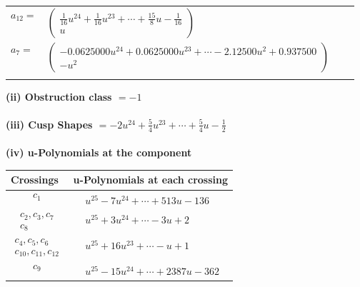 \documentclass[1p]{elsarticle_modified}
\theoremstyle{definition}
\begin{document}
\begin{tabular}{m{7pt} m{180pt} m{7pt} m{180pt} }
\flushright $a_{12}=$&$\begin{pmatrix}\frac{1}{16} u^{24}+\frac{1}{16} u^{23}+\cdots+\frac{15}{8} u-\frac{1}{16}\\u\end{pmatrix}$ \\
\flushright $a_{7}=$&$\begin{pmatrix}-0.0625000 u^{24}+0.0625000 u^{23}+\cdots-2.12500 u^{2}+0.937500\\- u^2\end{pmatrix}$\\&\end{tabular}
\flushleft \textbf{(ii) Obstruction class $= -1$}\\~\\
\flushleft \textbf{(iii) Cusp Shapes $= -2 u^{24}+\frac{5}{4} u^{23}+\cdots+\frac{5}{4} u-\frac{1}{2}$}\\~\\
\newpage\renewcommand{\arraystretch}{1}
\flushleft \textbf{(iv) u-Polynomials at the component}\newline \\
\begin{tabular}{m{50pt}|m{274pt}}
Crossings & \hspace{64pt}u-Polynomials at each crossing \\
\hline $$\begin{aligned}c_{1}\end{aligned}$$&$\begin{aligned}
&u^{25}-7 u^{24}+\cdots+513 u-136
\end{aligned}$\\
\hline $$\begin{aligned}c_{2},c_{3},c_{7}\\c_{8}\end{aligned}$$&$\begin{aligned}
&u^{25}+3 u^{24}+\cdots-3 u+2
\end{aligned}$\\
\hline $$\begin{aligned}c_{4},c_{5},c_{6}\\c_{10},c_{11},c_{12}\end{aligned}$$&$\begin{aligned}
&u^{25}+16 u^{23}+\cdots- u+1
\end{aligned}$\\
\hline $$\begin{aligned}c_{9}\end{aligned}$$&$\begin{aligned}
&u^{25}-15 u^{24}+\cdots+2387 u-362
\end{aligned}$\\
\hline
\end{tabular}\\~\\
\end{document}
